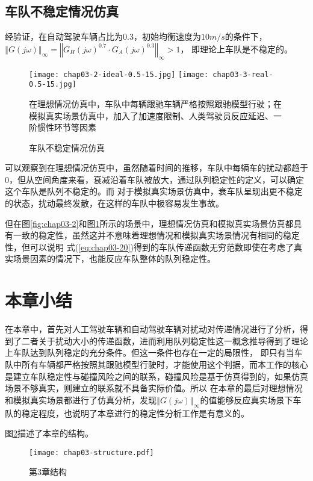 \subsection{车队不稳定情况仿真}

经验证，在自动驾驶车辆占比为0.3，初始均衡速度为$10m/s$的条件下，$\left\Vert G(j\omega) \right\Vert_{\infty} = \left\Vert G_H(j\omega)^{0.7} \cdot G_A(j\omega)^{0.3} \right\Vert_{\infty} > 1$，
即理论上车队是不稳定的。

\begin{figure}
  \centering
    {\texttt{[image: chap03-2-ideal-0.5-15.jpg]}}
    {\texttt{[image: chap03-3-real-0.5-15.jpg]}}
    \caption*{在理想情况仿真中，车队中每辆跟驰车辆严格按照跟驰模型行驶；在模拟真实场景仿真中，加入了加速度限制、人类驾驶员反应延迟、一阶惯性环节等因素}
    \caption{车队不稳定情况仿真}
  \label{fig:chap03-3}
\end{figure}

可以观察到在理想情况仿真中，虽然随着时间的推移，车队中每辆车的扰动都趋于0，但从空间角度来看，衰减沿着车队被放大，通过队列稳定性的定义，可以确定这个车队是队列不稳定的。而
对于模拟真实场景仿真中，衰车队呈现出更不稳定的状态，扰动最终发散，在这样的车队中极容易发生事故。

但在图\ref{fig:chap03-2}和图\ref{fig:chap03-3}所示的场景中，理想情况仿真和模拟真实场景仿真都具有一致的稳定性，虽然这并不意味着理想情况和模拟真实场景情况有相同的稳定性，但可以说明
式(\ref{eq:chap03-20})得到的车队传递函数无穷范数即使在考虑了真实场景因素的情况下，也能反应车队整体的队列稳定性。

\section{本章小结}
在本章中，首先对人工驾驶车辆和自动驾驶车辆对扰动对传递情况进行了分析，得到了二者关于扰动大小的传递函数，进而利用队列稳定性这一概念推导得到了理论上车队达到队列稳定的充分条件。但这一条件也存在一定的局限性，
即只有当车队中所有车辆都严格按照其跟驰模型行驶时，才能使用这个判据，而本工作的核心是建立车队稳定性与碰撞风险之间的联系，碰撞风险是基于仿真得到的，如果仿真场景不够真实，则建立的联系就不具备实际价值。所以
在本章的最后对理想情况和模拟真实场景都进行了仿真分析，发现$\left\Vert G(j\omega) \right\Vert_{\infty}$的值能够反应真实场景下车队的稳定程度，也说明了本章进行的稳定性分析工作是有意义的。

图\ref{fig:chap03-4}描述了本章的结构。

\begin{figure}
  \centering
  \texttt{[image: chap03-structure.pdf]}
  \caption{第3章结构}
  \label{fig:chap03-4}
\end{figure}